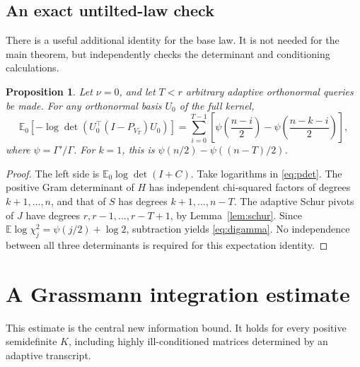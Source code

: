 \documentclass[11pt]{article}
\numberwithin{equation}{section}
\newtheorem{proposition}[theorem]{Proposition}
\theoremstyle{remark}\newtheorem{remark}[theorem]{Remark}
\newcommand{\E}{\mathbb E}
\begin{document}
\subsection{An exact untilted-law check}
There is a useful additional identity for the base law. It is not needed for the main theorem, but independently checks the determinant and conditioning calculations.
\begin{proposition}\label{prop:digamma}
Let $\nu=0$, and let $T<r$ arbitrary adaptive orthonormal queries be made. For any orthonormal basis $U_0$ of the full kernel,
\begin{equation}\label{eq:digamma}
\E_0[-\log\det(U_0^\top(I-P_{V_T})U_0)]
=\sum_{i=0}^{T-1}\left[\psi\!\left(\frac{n-i}{2}\right)
-\psi\!\left(\frac{n-k-i}{2}\right)\right],
\end{equation}
where $\psi=\Gamma'/\Gamma$. For $k=1$, this is $\psi(n/2)-\psi((n-T)/2)$.
\end{proposition}
\begin{proof}
The left side is $\E_0\log\det(I+C)$. Take logarithms in \eqref{eq:pdet}. The positive Gram determinant of $H$ has independent chi-squared factors of degrees $k+1,\ldots,n$, and that of $S$ has degrees $k+1,\ldots,n-T$. The adaptive Schur pivots of $J$ have degrees $r,r-1,\ldots,r-T+1$, by Lemma~\ref{lem:schur}. Since $\E\log\chi^2_j=\psi(j/2)+\log2$, subtraction yields \eqref{eq:digamma}. No independence between all three determinants is required for this expectation identity.
\end{proof}

\section{A Grassmann integration estimate}\label{sec:grassmann}
This estimate is the central new information bound. It holds for every positive semidefinite $K$, including highly ill-conditioned matrices determined by an adaptive transcript.
\end{document}
